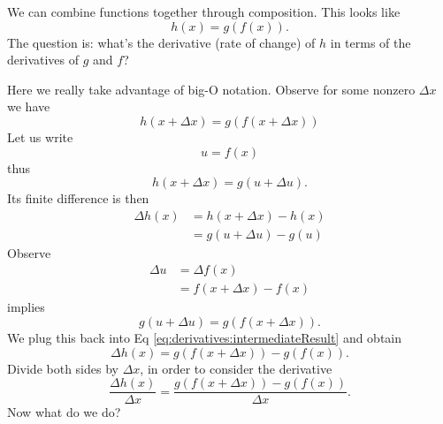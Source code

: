 We can combine functions together through composition. This looks
like
\begin{equation}
h(x)=g(f(x)).
\end{equation}
The question is: what's the derivative (rate of change) of $h$ in
terms of the derivatives of $g$ and $f$?

Here we really take advantage of big-O notation. Observe for some
nonzero $\Delta x$ we have
\begin{equation}
h(x+\Delta x)=g(f(x+\Delta x))
\end{equation}
Let us write
\begin{equation}
u = f(x)
\end{equation}
thus
\begin{equation}
h(x+\Delta x)=g(u+\Delta u).
\end{equation}
Its finite difference is then
\begin{subequations}\label{eq:derivatives:intermediateResult}
\begin{align}
\Delta h(x) &= h(x+\Delta x)-h(x)\\
&=g(u+\Delta u)-g(u)
\end{align}
\end{subequations}
Observe
\begin{subequations}\label{eq:chainRule:defnOfDeltaf}
\begin{align}
\Delta u &= \Delta f(x)\\
&= f(x+\Delta x)-f(x)
\end{align}
\end{subequations}
implies
\begin{equation}
g(u+\Delta u)=g(f(x+\Delta x)).
\end{equation}
We plug this back into Eq \eqref{eq:derivatives:intermediateResult}
and obtain
\begin{equation}
\Delta h(x) = g(f(x+\Delta x))-g(f(x)).
\end{equation}
Divide both sides by $\Delta x$, in order to consider the
derivative
\begin{equation}
\frac{\Delta h(x)}{\Delta x}=\frac{g\left(f(x+\Delta x)\right)-g\left(f(x)\right)}{\Delta{}x}.
\end{equation}
Now what do we do?
